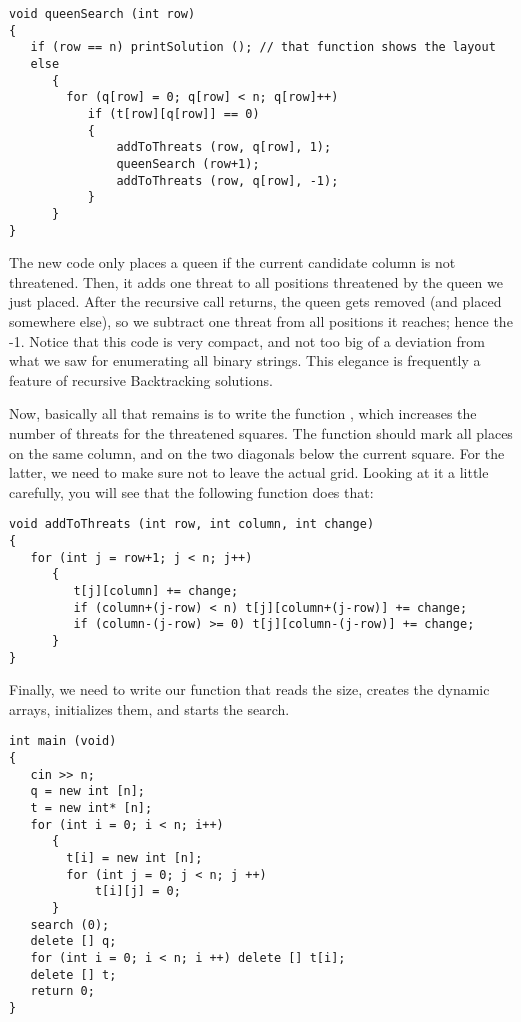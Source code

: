 \begin{verbatim}
void queenSearch (int row)
{
   if (row == n) printSolution (); // that function shows the layout
   else
      {
        for (q[row] = 0; q[row] < n; q[row]++)
           if (t[row][q[row]] == 0)
           {
               addToThreats (row, q[row], 1);
               queenSearch (row+1);
               addToThreats (row, q[row], -1);
           }
      }
}
\end{verbatim}

The new code  only places a queen if
the current candidate column is not threatened.
Then, it adds one threat to all positions threatened by the queen we
just placed.
After the recursive call returns, the queen gets removed (and placed
somewhere else), so we subtract one threat from all positions it
reaches; hence the -1.
Notice that this code is very compact, and not too big of a deviation
from what we saw for enumerating all binary strings.
This elegance is frequently a feature of recursive Backtracking
solutions.

Now, basically all that remains is to write the function ,
which increases the number of threats for the threatened squares.
The function should mark all places on the same column, and on the two
diagonals below the current square.
For the latter, we need to make sure not to leave the actual grid.
Looking at it a little carefully,
you will see that the following function does that:

\begin{verbatim}
void addToThreats (int row, int column, int change)
{
   for (int j = row+1; j < n; j++)
      {
         t[j][column] += change;
         if (column+(j-row) < n) t[j][column+(j-row)] += change;
         if (column-(j-row) >= 0) t[j][column-(j-row)] += change;
      }
}
\end{verbatim}

Finally, we need to write our  function that reads the
size, creates the dynamic arrays, initializes them, and starts the
search.

\begin{verbatim}
int main (void)
{
   cin >> n;
   q = new int [n];
   t = new int* [n];
   for (int i = 0; i < n; i++)
      {
        t[i] = new int [n];
        for (int j = 0; j < n; j ++)
            t[i][j] = 0;
      }
   search (0);
   delete [] q;
   for (int i = 0; i < n; i ++) delete [] t[i];
   delete [] t;
   return 0;
}
\end{verbatim}

